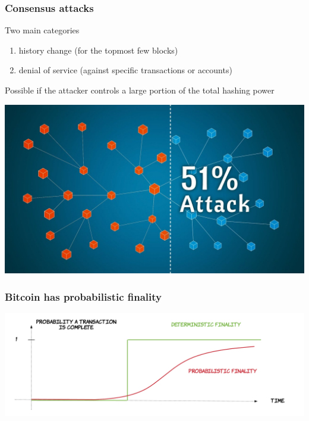 \documentclass[11pt]{beamer}  %
\begin{document}
\begin{frame}\frametitle{Consensus attacks}

  \begin{greenbox}{Two main categories}
    \begin{enumerate}
    \item history change (for the topmost few blocks)
    \item denial of service (against specific transactions or accounts)
    \end{enumerate}
  \end{greenbox}

  \bigskip

  Possible if the attacker controls a large portion of the total hashing power

  \begin{center}
    \includegraphics[scale=0.17,clip=false]{pictures/51-percenters.jpg}
  \end{center}

\end{frame}

\begin{frame}\frametitle{Bitcoin has probabilistic finality}

  \begin{center}
    \includegraphics[width=\textwidth,clip=false]{pictures/finality.png}
  \end{center}

\end{frame}
\end{document}
